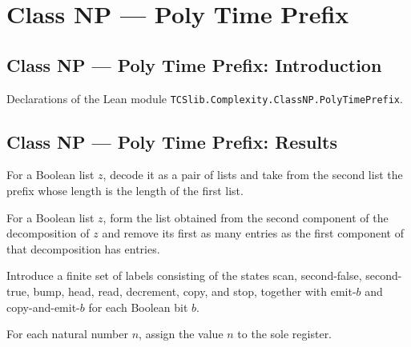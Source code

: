 \section{Class NP --- Poly Time Prefix}
\subsection*{Class NP --- Poly Time Prefix: Introduction}

Declarations of the Lean module \texttt{TCSlib.Complexity.ClassNP.PolyTimePrefix}.

\subsection*{Class NP --- Poly Time Prefix: Results}

\begin{definition}
\label{Complexity.PrefixByLength.take}
\leanok
{}
For a Boolean list $z$, decode it as a pair of lists and take from the second list the
prefix whose length is the length of the first list.
\end{definition}

\begin{definition}
\label{Complexity.PrefixByLength.drop}
\leanok
{}
For a Boolean list $z$, form the list obtained from the second component of the
decomposition of $z$ and remove its first as many entries as the first component of that
decomposition has entries.
\end{definition}

\begin{definition}
\label{Complexity.PrefixByLength.Label}
\leanok
Introduce a finite set of labels consisting of the states scan, second-false,
second-true, bump, head, read, decrement, copy, and stop, together with emit-$b$ and
copy-and-emit-$b$ for each Boolean bit $b$.
\end{definition}

\begin{definition}
\label{Complexity.PrefixByLength.regs}
\leanok
For each natural number $n$, assign the value $n$ to the sole register.
\end{definition}

